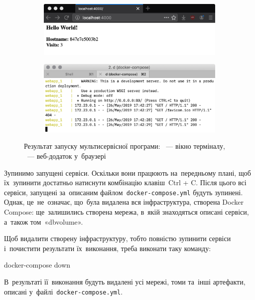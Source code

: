 \documentclass[
	a4paper,
	oneside,
	BCOR = 10mm,
	DIV = 12,
	12pt,
	headings = normal,
]{scrartcl}
\newlength{\gridunitwidth}
\newcommand{\filename}[1]{\texttt{#1}}
\begin{document}
					\begin{figure}[!htbp]
						\centering
						\begin{subfigure}{\columnwidth}
							\centering
							\includegraphics[width=10\gridunitwidth]{./assets/y03s02-syssoft-homework-01-p06a.png}
							\caption{}
							\label{subfig:docker-compose-up-res-term}
						\end{subfigure}
						\begin{subfigure}{\columnwidth}
							\centering
							\includegraphics[width=10\gridunitwidth]{./assets/y03s02-syssoft-homework-01-p06b.png}
							\caption{}
							\label{subfig:docker-compose-up-res-webapp}
						\end{subfigure}
						\caption{Результат запуску мультисервісної програми: ~— вікно терміналу, ~— веб-додаток у~браузері}
						\label{fig:docker-compose-up-res}
					\end{figure}

					Зупинимо запущені сервіси. Оскільки вони працюють на~передньому плані, щоб їх~зупинити достатньо натиснути комбінацію клавіш~\textenglish{Ctrl + C}. Після цього всі сервіси, запущені за~описаним файлом~\filename{\textenglish{docker-compose.yml}} будуть зупинені. Однак, це~не~означає, що~була видалена вся інфраструктура, створена \textenglish{Docker Compose}: ще~залишились створена мережа, в~якій знаходяться описані сервіси, а~також том~«\textenglish{dbvolume}».

					Щоб видалити створену інфраструктуру, тобто повністю зупинити сервіси і~почистити результати їх~виконання, треба виконати таку команду:
					\begin{bashterm}
						docker-compose down
					\end{bashterm}
					В~результаті її~виконання будуть видалені усі мережі, томи та~інші артефакти, описані у~файлі~\filename{\textenglish{docker-compose.yml}}.
\end{document}
